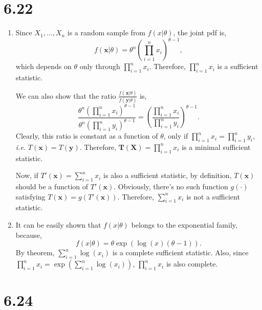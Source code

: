\documentclass[letterpaper]{article}
\newcommand{\bx}{\mathbf{x}}
\newcommand{\by}{\mathbf{y}}
\newcommand{\TX}{\mathbf{T(X)}}
\begin{document}
    \section*{6.22}
    \begin{enumerate}
    \item Since $X_1, \dots, X_n$ is a random sample from $f(x|\theta)$, the joint pdf is, 
    \[
    f(\bx|\theta) = \theta^n \left(\prod_{i=1}^n x_i\right)^{\theta -1},
    \]
    which depends on $\theta$ only through $\prod_{i=1}^n x_i$. Therefore, $\prod_{i=1}^n x_i$ is a sufficient statistic.

    We can also show that the ratio $\frac{f(\bx|\theta)}{f(\by|\theta)}$ is,
    \[
    \frac{\theta^n \left(\prod_{i=1}^n x_i\right)^{\theta -1}}{\theta^n \left(\prod_{i=1}^n y_i\right)^{\theta -1}} = 
    \left(\frac{\prod_{i=1}^n x_i}{\prod_{i=1}^n y_i}\right)^{\theta -1}.
    \]
    Clearly, this ratio is constant as a function of $\theta$, only if $\prod_{i=1}^n x_i = \prod_{i=1}^n y_i$, \emph{i.e.} $T(\bx) = T(\by)$. 
    Therefore, $\TX = \prod_{i=1}^n x_i$ is a minimal sufficient statistic.

    Now, if $T'(\bx) = \sum_{i=1}^n x_i$ is also a sufficient statistic, by definition, $T(\bx)$ should be a function of $T'(\bx)$. Obviously, there's no such function $g(\cdot)$ satisfying $T(\bx) = g(T'(\bx))$. Therefore, $\sum_{i=1}^n x_i$ is not a sufficient statistic.
    \item It can be easily shown that $f(x|\theta)$ belongs to the exponential family, because,
    \[
    f(x|\theta) = \theta \exp(\log(x) (\theta-1)).
    \]
    By theorem, $\sum_{i=1}^n \log(x_i)$ is a complete sufficient statistic. Also, since $\prod_{i=1}^n x_i = \exp\left(\sum_{i=1}^n \log(x_i)\right)$, $\prod_{i=1}^n x_i$ is also complete.
    \end{enumerate}

    \section*{6.24}
\end{document}
